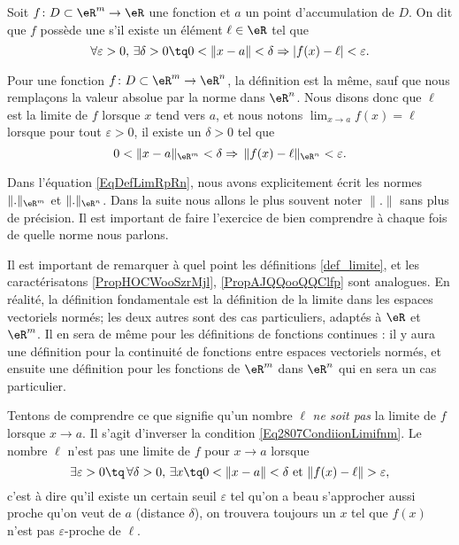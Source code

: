 \begin{definition}\label{def_limite}
	Soit $f\colon D\subset\eR^m\to \eR$ une fonction et $a$ un point d'accumulation de $D$.  On dit que $f$ possède une  s'il existe un élément $\ell\in\eR$ tel que
	\begin{equation}		\label{Eq2807CondiionLimifnm}
		\forall\varepsilon>0,\,\exists\delta>0\tq 0<\| x-a \|<\delta\Rightarrow | f(x)-\ell |<\varepsilon.
	\end{equation}
	
	Pour une fonction $f\colon D\subset\eR^m\to \eR^n$, la définition est la même, sauf que nous remplaçons la valeur absolue par la norme dans $\eR^n$. Nous disons donc que $\ell$ est la limite de $f$ lorsque $x$ tend vers $a$, et nous notons $\lim_{x\to a} f(x)=\ell$ lorsque pour tout $\varepsilon>0$, il existe un $\delta>0$ tel que
	\begin{equation}		\label{EqDefLimRpRn}
		0<\| x-a \|_{\eR^m}<\delta\Rightarrow\,\| f(x)-\ell \|_{\eR^n}<\varepsilon.
	\end{equation}
\end{definition}

\begin{remark}
	Dans l'équation \eqref{EqDefLimRpRn}, nous avons explicitement écrit les normes $\| . \|_{\eR^m}$ et $\| . \|_{\eR^n}$. Dans la suite nous allons le plus souvent noter $\| . \|$ sans plus de précision. Il est important de faire l'exercice de bien comprendre à chaque fois de quelle norme nous parlons.
\end{remark}

\begin{remark}
	Il est important de remarquer à quel point les définitions \ref{def_limite}, et les caractérisatons \ref{PropHOCWooSzrMjl}, \ref{PropAJQQooQQClfp} sont analogues. En réalité, la définition fondamentale est la définition de la limite dans les espaces vectoriels normés; les deux autres sont des cas particuliers, adaptés à $\eR$ et $\eR^m$. Il en sera de même pour les définitions de fonctions continues : il y aura une définition pour la continuité de fonctions entre espaces vectoriels normés, et ensuite une définition pour les fonctions de $\eR^m$ dans $\eR^n$ qui en sera un cas particulier.
\end{remark}

Tentons de comprendre ce que signifie qu'un nombre $\ell$ \emph{ne soit pas} la limite de $f$ lorsque $x\to a$. Il s'agit d'inverser la condition \eqref{Eq2807CondiionLimifnm}. Le nombre $\ell$ n'est pas une limite de $f$ pour $x\to a$ lorsque
\begin{equation}		\label{EqCaractNonLim}
	\exists\varepsilon>0\tq\,\forall\delta>0,\,\exists x\tq 0<\| x-a \|<\delta\text{ et }\| f(x)-\ell \|>\varepsilon,
\end{equation}
c'est à dire qu'il existe un certain seuil $\varepsilon$ tel qu'on a beau s'approcher aussi proche qu'on veut de $a$ (distance $\delta$), on trouvera toujours un $x$ tel que $f(x)$ n'est pas $\varepsilon$-proche de $\ell$.


